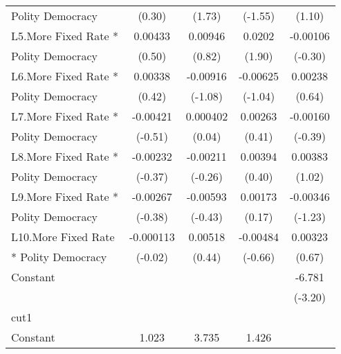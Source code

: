 {\begin{tabular}{l*{4}{c}}
Polity Democracy    &      (0.30)         &      (1.73)         &     (-1.55)         &      (1.10)         \\
[1em]
L5.More Fixed Rate *&     0.00433         &     0.00946         &      0.0202         &    -0.00106         \\
Polity Democracy    &      (0.50)         &      (0.82)         &      (1.90)         &     (-0.30)         \\
[1em]
L6.More Fixed Rate *&     0.00338         &    -0.00916         &    -0.00625         &     0.00238         \\
Polity Democracy    &      (0.42)         &     (-1.08)         &     (-1.04)         &      (0.64)         \\
[1em]
L7.More Fixed Rate *&    -0.00421         &    0.000402         &     0.00263         &    -0.00160         \\
Polity Democracy    &     (-0.51)         &      (0.04)         &      (0.41)         &     (-0.39)         \\
[1em]
L8.More Fixed Rate *&    -0.00232         &    -0.00211         &     0.00394         &     0.00383         \\
Polity Democracy    &     (-0.37)         &     (-0.26)         &      (0.40)         &      (1.02)         \\
[1em]
L9.More Fixed Rate *&    -0.00267         &    -0.00593         &     0.00173         &    -0.00346         \\
Polity Democracy    &     (-0.38)         &     (-0.43)         &      (0.17)         &     (-1.23)         \\
[1em]
L10.More Fixed Rate &   -0.000113         &     0.00518         &    -0.00484         &     0.00323         \\
* Polity Democracy  &     (-0.02)         &      (0.44)         &     (-0.66)         &      (0.67)         \\
[1em]
Constant            &                     &                     &                     &      -6.781\sym{**} \\
                    &                     &                     &                     &     (-3.20)         \\
\hline
cut1                &                     &                     &                     &                     \\
Constant            &       1.023         &       3.735\sym{*}  &       1.426         &                     \\

\end{tabular}}
